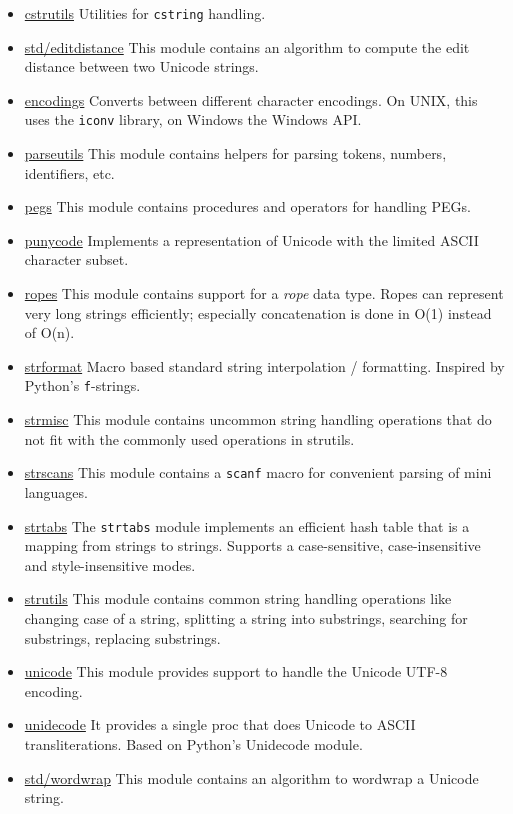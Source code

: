 \begin{itemize}
\tightlist
\item
  \href{cstrutils.html}{cstrutils} Utilities for \texttt{cstring}
  handling.
\item
  \href{editdistance.html}{std/editdistance} This module contains an
  algorithm to compute the edit distance between two Unicode strings.
\item
  \href{encodings.html}{encodings} Converts between different character
  encodings. On UNIX, this uses the \texttt{iconv} library, on Windows
  the Windows API.
\item
  \href{parseutils.html}{parseutils} This module contains helpers for
  parsing tokens, numbers, identifiers, etc.
\item
  \href{pegs.html}{pegs} This module contains procedures and operators
  for handling PEGs.
\item
  \href{punycode.html}{punycode} Implements a representation of Unicode
  with the limited ASCII character subset.
\item
  \href{ropes.html}{ropes} This module contains support for a
  \emph{rope} data type. Ropes can represent very long strings
  efficiently; especially concatenation is done in O(1) instead of O(n).
\item
  \href{strformat.html}{strformat} Macro based standard string
  interpolation / formatting. Inspired by Python's \texttt{f}-strings.
\item
  \href{strmisc.html}{strmisc} This module contains uncommon string
  handling operations that do not fit with the commonly used operations
  in strutils.
\item
  \href{strscans.html}{strscans} This module contains a \texttt{scanf}
  macro for convenient parsing of mini languages.
\item
  \href{strtabs.html}{strtabs} The \texttt{strtabs} module implements an
  efficient hash table that is a mapping from strings to strings.
  Supports a case-sensitive, case-insensitive and style-insensitive
  modes.
\item
  \href{strutils.html}{strutils} This module contains common string
  handling operations like changing case of a string, splitting a string
  into substrings, searching for substrings, replacing substrings.
\item
  \href{unicode.html}{unicode} This module provides support to handle
  the Unicode UTF-8 encoding.
\item
  \href{unidecode.html}{unidecode} It provides a single proc that does
  Unicode to ASCII transliterations. Based on Python's Unidecode module.
\item
  \href{wordwrap.html}{std/wordwrap} This module contains an algorithm
  to wordwrap a Unicode string.
\end{itemize}

